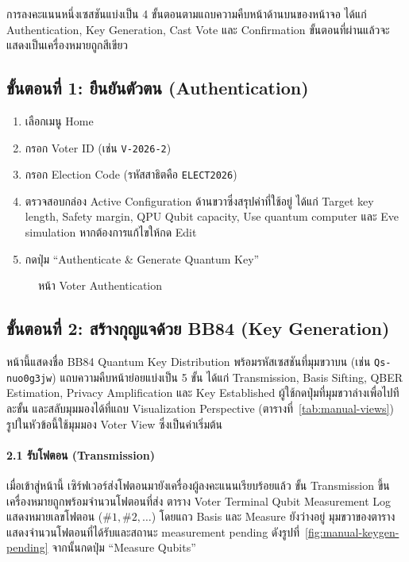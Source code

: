 การลงคะแนนหนึ่งเซสชันแบ่งเป็น 4 ขั้นตอนตามแถบความคืบหน้าด้านบนของหน้าจอ ได้แก่
Authentication, Key Generation, Cast Vote และ Confirmation
ขั้นตอนที่ผ่านแล้วจะแสดงเป็นเครื่องหมายถูกสีเขียว

\subsection{ขั้นตอนที่ 1: ยืนยันตัวตน (Authentication)}

\begin{enumerate}
  \item เลือกเมนู Home
  \item กรอก Voter ID (เช่น \texttt{V-2026-2})
  \item กรอก Election Code (รหัสสาธิตคือ \texttt{ELECT2026})
  \item ตรวจสอบกล่อง Active Configuration ด้านขวาซึ่งสรุปค่าที่ใช้อยู่ ได้แก่ Target key length, Safety margin,
        QPU Qubit capacity, Use quantum computer และ Eve simulation หากต้องการแก้ไขให้กด Edit
  \item กดปุ่ม ``Authenticate \& Generate Quantum Key''
\end{enumerate}


\begin{figure}[htbp]
\centering
\caption{หน้า Voter Authentication}
\label{fig:manual-auth}
\end{figure}

\subsection{ขั้นตอนที่ 2: สร้างกุญแจด้วย BB84 (Key Generation)}

หน้านี้แสดงชื่อ BB84 Quantum Key Distribution พร้อมรหัสเซสชันที่มุมขวาบน (เช่น \texttt{Qs-nuo0g3jw})
แถบความคืบหน้าย่อยแบ่งเป็น 5 ขั้น ได้แก่ Transmission, Basis Sifting, QBER Estimation,
Privacy Amplification และ Key Established
ผู้ใช้กดปุ่มที่มุมขวาล่างเพื่อไปทีละขั้น และสลับมุมมองได้ที่แถบ Visualization Perspective
(ตารางที่~\ref{tab:manual-views}) รูปในหัวข้อนี้ใช้มุมมอง Voter View ซึ่งเป็นค่าเริ่มต้น

\paragraph{2.1 รับโฟตอน (Transmission)}
เมื่อเข้าสู่หน้านี้ เซิร์ฟเวอร์ส่งโฟตอนมายังเครื่องผู้ลงคะแนนเรียบร้อยแล้ว
ขั้น Transmission ขึ้นเครื่องหมายถูกพร้อมจำนวนโฟตอนที่ส่ง
ตาราง Voter Terminal Qubit Measurement Log แสดงหมายเลขโฟตอน
($\#1, \#2, \ldots$) โดยแถว Basis และ Measure ยังว่างอยู่
มุมขวาของตารางแสดงจำนวนโฟตอนที่ได้รับและสถานะ measurement pending
ดังรูปที่~\ref{fig:manual-keygen-pending} จากนั้นกดปุ่ม ``Measure Qubits''

